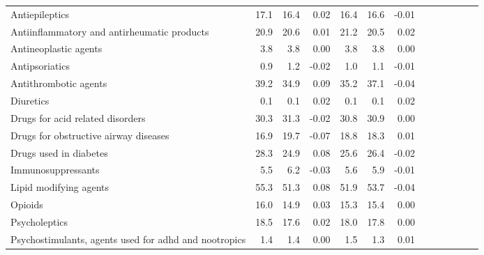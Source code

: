\documentclass[11pt,]{article}
\begin{document}
\begin{longtable}{lrrrrrrrrrrrr}
      Antiepileptics & 17.1 & 16.4 &  0.02 & 16.4 & 16.6 & -0.01 \\ 
      Antiinflammatory and antirheumatic products & 20.9 & 20.6 &  0.01 & 21.2 & 20.5 &  0.02 \\ 
      Antineoplastic agents &  3.8 &  3.8 &  0.00 &  3.8 &  3.8 &  0.00 \\ 
      Antipsoriatics &  0.9 &  1.2 & -0.02 &  1.0 &  1.1 & -0.01 \\ 
      Antithrombotic agents & 39.2 & 34.9 &  0.09 & 35.2 & 37.1 & -0.04 \\ 
      Diuretics &  0.1 &  0.1 &  0.02 &  0.1 &  0.1 &  0.02 \\ 
      Drugs for acid related disorders & 30.3 & 31.3 & -0.02 & 30.8 & 30.9 &  0.00 \\ 
      Drugs for obstructive airway diseases & 16.9 & 19.7 & -0.07 & 18.8 & 18.3 &  0.01 \\ 
      Drugs used in diabetes & 28.3 & 24.9 &  0.08 & 25.6 & 26.4 & -0.02 \\ 
      Immunosuppressants &  5.5 &  6.2 & -0.03 &  5.6 &  5.9 & -0.01 \\ 
      Lipid modifying agents & 55.3 & 51.3 &  0.08 & 51.9 & 53.7 & -0.04 \\ 
      Opioids & 16.0 & 14.9 &  0.03 & 15.3 & 15.4 &  0.00 \\ 
      Psycholeptics & 18.5 & 17.6 &  0.02 & 18.0 & 17.8 &  0.00 \\ 
      Psychostimulants, agents used for adhd and nootropics &  1.4 &  1.4 &  0.00 &  1.5 &  1.3 &  0.01 \\ 
   \bottomrule\end{longtable}
\clearpage
{}
\end{document}
